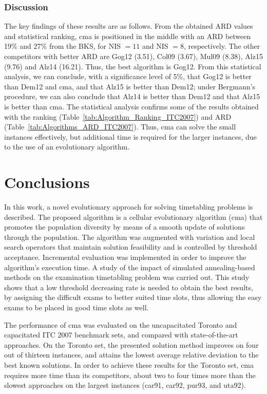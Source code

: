 \subsubsection{Discussion}

The key findings of these results are as follows. From the obtained ARD values and statistical ranking, \gls{cma} is positioned in the middle with an ARD between 19\% and 27\% from the BKS, for NIS $=11$ and NIS $=8$, respectively. The other competitors with better ARD are Gog12 (3.51), Col09 (3.67), Mul09 (8.38), Alz15 (9.76) and Alz14 (16.21). Thus, the best algorithm is Gog12. From this statistical analysis, we can conclude, with a significance level of 5\%, that Gog12 is better than Dem12 and \gls{cma}, and that Alz15 is better than Dem12; under Bergmann's procedure, we can also conclude that Alz14 is better than Dem12 and that Alz15 is better than \gls{cma}. The statistical analysis confirms some of the results obtained with the ranking (Table~\ref{tab:Algorithm_Ranking_ITC2007}) and ARD (Table~\ref{tab:Algorithms_ARD_ITC2007}). Thus, \gls{cma} can solve the small instances effectively, but additional time is required for the larger instances, due to the use of an evolutionary algorithm.




%
%
\section{Conclusions}
\label{sec:Chapter6_Conclusion}


In this work, a novel evolutionary approach for solving timetabling problems is described. The proposed algorithm is a cellular evolutionary algorithm (\gls{cma}) that promotes the population diversity by means of a smooth update of solutions through the population. The algorithm was augmented with variation and local search operators that maintain solution feasibility and is controlled by threshold acceptance. Incremental evaluation was implemented in order to improve the algorithm's execution time. A study of the impact of simulated annealing-based methods on the examination timetabling problem was carried out. This study shows that a low threshold decreasing rate is needed to obtain the best results, by assigning the difficult exams to better suited time slots, thus allowing the easy exams to be placed in good time slots as well.

The performance of \gls{cma} was evaluated on the uncapacitated Toronto and capacitated ITC 2007 benchmark sets, and compared with state-of-the-art approaches. On the Toronto set, the presented solution method improves on four out of thirteen instances, and attains the lowest average relative deviation to the best known solutions. In order to achieve these results for the Toronto set, \gls{cma} requires more time than its competitors, about two to four times more than the slowest approaches on the largest instances (car91, car92, pur93, and uta92).

